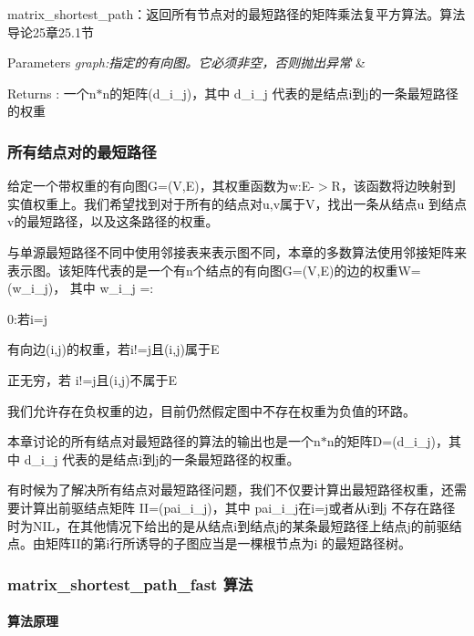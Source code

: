 matrix\+\_\+shortest\+\_\+path：返回所有节点对的最短路径的矩阵乘法复平方算法。算法导论25章25.1节 


\begin{DoxyParams}{Parameters}
{\em graph\+:指定的有向图。它必须非空，否则抛出异常} & \\
\hline
\end{DoxyParams}
\begin{DoxyReturn}{Returns}
\+: 一个n$\ast$n的矩阵(d\+\_\+i\+\_\+j)，其中 d\+\_\+i\+\_\+j 代表的是结点i到j的一条最短路径的权重
\end{DoxyReturn}
\subsubsection*{所有结点对的最短路径}

给定一个带权重的有向图\+G=(V,E)，其权重函数为w\+:E-\/$>$R，该函数将边映射到实值权重上。我们希望找到对于所有的结点对u,v属于\+V，找出一条从结点u 到结点v的最短路径，以及这条路径的权重。

与单源最短路径不同中使用邻接表来表示图不同，本章的多数算法使用邻接矩阵来表示图。该矩阵代表的是一个有n个结点的有向图\+G=(V,E)的边的权重\+W=(w\+\_\+i\+\_\+j)， 其中 w\+\_\+i\+\_\+j =\+:


\begin{DoxyItemize}
\item 0\+:若i=j
\item 有向边(i,j)的权重，若i!=j且(i,j)属于\+E
\item 正无穷，若 i!=j且(i,j)不属于\+E
\end{DoxyItemize}

我们允许存在负权重的边，目前仍然假定图中不存在权重为负值的环路。

本章讨论的所有结点对最短路径的算法的输出也是一个n$\ast$n的矩阵\+D=(d\+\_\+i\+\_\+j)，其中 d\+\_\+i\+\_\+j 代表的是结点i到j的一条最短路径的权重。

有时候为了解决所有结点对最短路径问题，我们不仅要计算出最短路径权重，还需要计算出前驱结点矩阵 I\+I=(pai\+\_\+i\+\_\+j)，其中 pai\+\_\+i\+\_\+j在i=j或者从i到j 不存在路径时为\+N\+I\+L，在其他情况下给出的是从结点i到结点j的某条最短路径上结点j的前驱结点。由矩阵\+I\+I的第i行所诱导的子图应当是一棵根节点为i 的最短路径树。

\subsubsection*{matrix\+\_\+shortest\+\_\+path\+\_\+fast 算法}

\paragraph*{算法原理}


